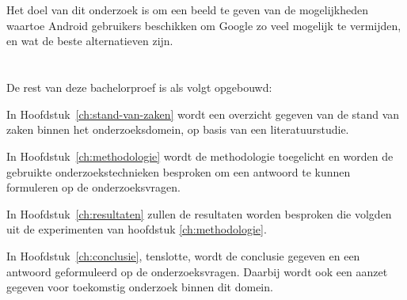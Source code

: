 \section{}
\label{sec:onderzoeksdoelstelling}

Het doel van dit onderzoek is om een beeld te geven van de mogelijkheden waartoe Android gebruikers beschikken om Google zo veel mogelijk te vermijden, en wat de beste alternatieven zijn.

\section{}
\label{sec:opzet-bachelorproef}


De rest van deze bachelorproef is als volgt opgebouwd:

In Hoofdstuk~\ref{ch:stand-van-zaken} wordt een overzicht gegeven van de stand van zaken binnen het onderzoeksdomein, op basis van een literatuurstudie.

In Hoofdstuk~\ref{ch:methodologie} wordt de methodologie toegelicht en worden de gebruikte onderzoekstechnieken besproken om een antwoord te kunnen formuleren op de onderzoeksvragen.

In Hoofdstuk~\ref{ch:resultaten} zullen de resultaten worden besproken die volgden uit de experimenten van hoofdstuk \ref{ch:methodologie}.

In Hoofdstuk~\ref{ch:conclusie}, tenslotte, wordt de conclusie gegeven en een antwoord geformuleerd op de onderzoeksvragen. Daarbij wordt ook een aanzet gegeven voor toekomstig onderzoek binnen dit domein.